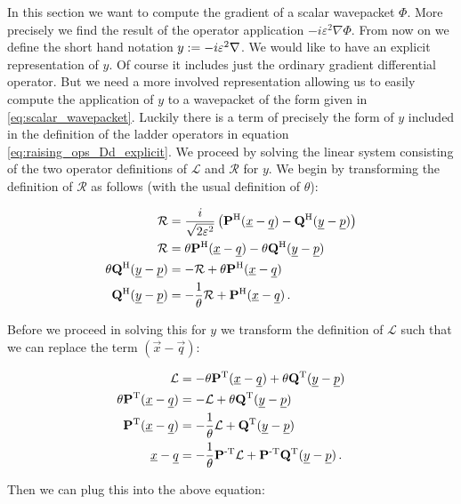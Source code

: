In this section we want to compute the gradient of a scalar wavepacket $\Phi$. More precisely
we find the result of the operator application $-i \varepsilon^2 \nabla \Phi$. From
now on we define the short hand notation $y := -i \varepsilon^2 \nabla$. We would
like to have an explicit representation of $y$. Of course it includes just the ordinary
gradient differential operator. But we need a more involved representation allowing us to
easily compute the application of $y$ to a wavepacket of the form given in \eqref{eq:scalar_wavepacket}.
Luckily there is a term of precisely the form of $y$ included in the definition of the
ladder operators in equation \eqref{eq:raising_ops_Dd_explicit}. We proceed by solving the
linear system consisting of the two operator definitions of $\mathcal{L}$ and $\mathcal{R}$
for $y$. We begin by transforming the definition of $\mathcal{R}$ as follows (with the usual
definition of $\theta$):

\begin{align*}
  \mathcal{R} & =  \frac{i}{\sqrt{2\varepsilon^2}} \left( \mathbf{P}{}^{\textnormal{H}} (\underline{x}-\underline{q}) - \mathbf{Q}{}^{\textnormal{H}} (\underline{y}-\underline{p}) \right) \\
  \mathcal{R} & = \theta \mathbf{P}{}^{\textnormal{H}} (\underline{x}-\underline{q}) - \theta \mathbf{Q}{}^{\textnormal{H}} (\underline{y}-\underline{p}) \\
  \theta \mathbf{Q}{}^{\textnormal{H}} (\underline{y}-\underline{p}) & = -\mathcal{R} + \theta \mathbf{P}{}^{\textnormal{H}} (\underline{x}-\underline{q}) \\
  \mathbf{Q}{}^{\textnormal{H}} (\underline{y}-\underline{p}) & = -\frac{1}{\theta} \mathcal{R} + \mathbf{P}{}^{\textnormal{H}} (\underline{x}-\underline{q}) \,.
\end{align*}

Before we proceed in solving this for $y$ we transform the definition of $\mathcal{L}$
such that we can replace the term $(\vec{x}-\vec{q})$:

\begin{align*}
  \mathcal{L} & = -\theta \mathbf{P}{}^{\textnormal{T}} (\underline{x}-\underline{q}) + \theta \mathbf{Q}{}^{\textnormal{T}} (\underline{y}-\underline{p}) \\
  \theta \mathbf{P}{}^{\textnormal{T}} (\underline{x}-\underline{q}) & = -\mathcal{L} + \theta \mathbf{Q}{}^{\textnormal{T}} (\underline{y}-\underline{p}) \\
  \mathbf{P}{}^{\textnormal{T}} (\underline{x}-\underline{q}) & = -\frac{1}{\theta}\mathcal{L} + \mathbf{Q}{}^{\textnormal{T}} (\underline{y}-\underline{p}) \\
  \underline{x}-\underline{q} & = -\frac{1}{\theta}\mathbf{P}{}^{\textnormal{-T}}\mathcal{L} + \mathbf{P}{}^{\textnormal{-T}}\mathbf{Q}{}^{\textnormal{T}} (\underline{y}-\underline{p}) \,.
\end{align*}

Then we can plug this into the above equation:

